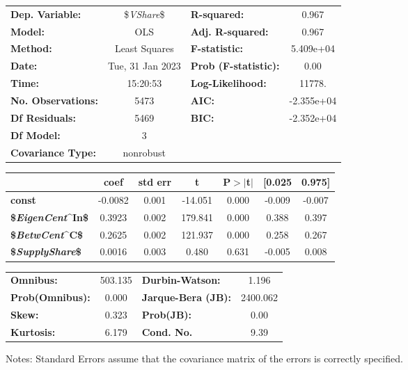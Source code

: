 \begin{center}
\begin{tabular}{lclc}
\toprule
\textbf{Dep. Variable:}           & \${\it VShare}\$ & \textbf{  R-squared:         } &     0.967   \\
\textbf{Model:}                   &       OLS        & \textbf{  Adj. R-squared:    } &     0.967   \\
\textbf{Method:}                  &  Least Squares   & \textbf{  F-statistic:       } & 5.409e+04   \\
\textbf{Date:}                    & Tue, 31 Jan 2023 & \textbf{  Prob (F-statistic):} &     0.00    \\
\textbf{Time:}                    &     15:20:53     & \textbf{  Log-Likelihood:    } &    11778.   \\
\textbf{No. Observations:}        &        5473      & \textbf{  AIC:               } & -2.355e+04  \\
\textbf{Df Residuals:}            &        5469      & \textbf{  BIC:               } & -2.352e+04  \\
\textbf{Df Model:}                &           3      & \textbf{                     } &             \\
\textbf{Covariance Type:}         &    nonrobust     & \textbf{                     } &             \\
\bottomrule
\end{tabular}
\begin{tabular}{lcccccc}
                                  & \textbf{coef} & \textbf{std err} & \textbf{t} & \textbf{P$> |$t$|$} & \textbf{[0.025} & \textbf{0.975]}  \\
\midrule
\textbf{const}                    &      -0.0082  &        0.001     &   -14.051  &         0.000        &       -0.009    &       -0.007     \\
\textbf{\${\it EigenCent}^{In}\$} &       0.3923  &        0.002     &   179.841  &         0.000        &        0.388    &        0.397     \\
\textbf{\${\it BetwCent}^C\$}     &       0.2625  &        0.002     &   121.937  &         0.000        &        0.258    &        0.267     \\
\textbf{\${\it SupplyShare}\$}    &       0.0016  &        0.003     &     0.480  &         0.631        &       -0.005    &        0.008     \\
\bottomrule
\end{tabular}
\begin{tabular}{lclc}
\textbf{Omnibus:}       & 503.135 & \textbf{  Durbin-Watson:     } &    1.196  \\
\textbf{Prob(Omnibus):} &   0.000 & \textbf{  Jarque-Bera (JB):  } & 2400.062  \\
\textbf{Skew:}          &   0.323 & \textbf{  Prob(JB):          } &     0.00  \\
\textbf{Kurtosis:}      &   6.179 & \textbf{  Cond. No.          } &     9.39  \\
\bottomrule
\end{tabular}
\end{center}

Notes: \newline
 [1] Standard Errors assume that the covariance matrix of the errors is correctly specified.